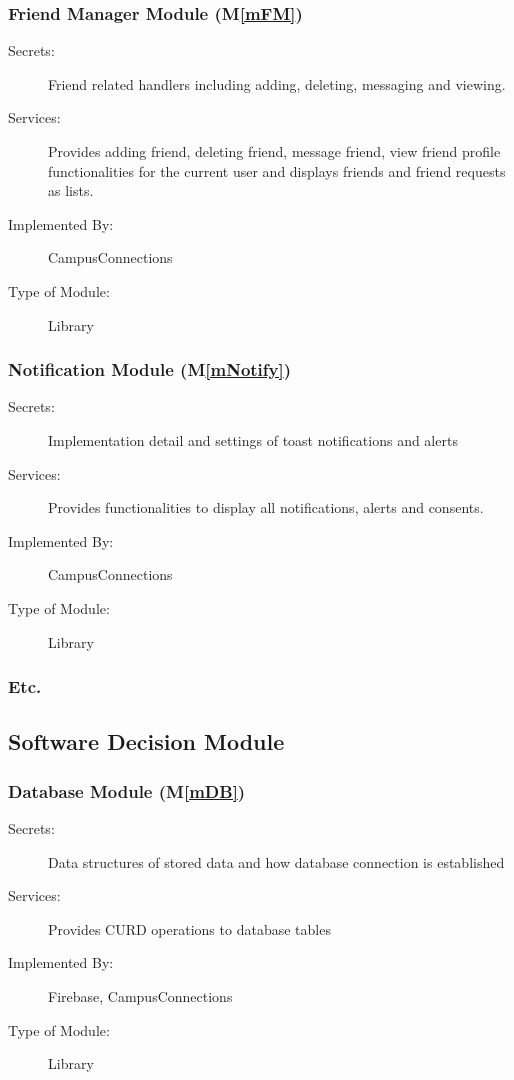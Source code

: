\documentclass[12pt, titlepage]{article}
\newcommand{\mref}[1]{M\ref{#1}}
\begin{document}
\subsubsection{Friend Manager Module (\mref{mFM})}

\begin{description}
\item[Secrets:]Friend related handlers including adding, deleting, messaging and viewing.
\item[Services:]Provides adding friend, deleting friend, message friend, view friend profile functionalities for the current user and displays friends and friend requests as lists.
\item[Implemented By:] CampusConnections
\item[Type of Module:] Library
\end{description}

\subsubsection{Notification Module (\mref{mNotify})}

\begin{description}
\item[Secrets:]Implementation detail and settings of toast notifications and alerts
\item[Services:]Provides functionalities to display all notifications, alerts and consents.
\item[Implemented By:] CampusConnections
\item[Type of Module:] Library
\end{description}

\subsubsection{Etc.}


\subsection{Software Decision Module}

\subsubsection{Database Module (\mref{mDB})}
\begin{description}
\item[Secrets:]Data structures of stored data and how database connection is established
\item[Services:]Provides CURD operations to database tables
\item[Implemented By:] Firebase, CampusConnections
\item[Type of Module:] Library
\end{description}
\end{document}
